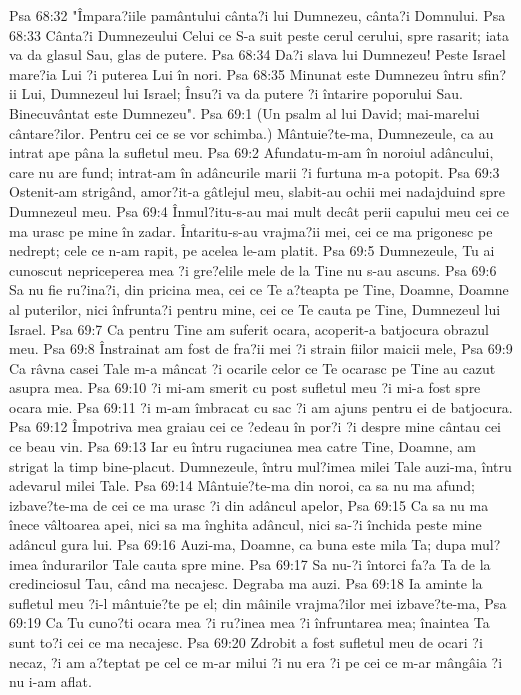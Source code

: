 Psa 68:32  "Împara?iile pamântului cânta?i lui Dumnezeu, cânta?i Domnului.
Psa 68:33  Cânta?i Dumnezeului Celui ce S-a suit peste cerul cerului, spre rasarit; iata va da glasul Sau, glas de putere.
Psa 68:34  Da?i slava lui Dumnezeu! Peste Israel mare?ia Lui ?i puterea Lui în nori.
Psa 68:35  Minunat este Dumnezeu întru sfin?ii Lui, Dumnezeul lui Israel; Însu?i va da putere ?i întarire poporului Sau. Binecuvântat este Dumnezeu".
Psa 69:1  (Un psalm al lui David; mai-marelui cântare?ilor. Pentru cei ce se vor schimba.) Mântuie?te-ma, Dumnezeule, ca au intrat ape pâna la sufletul meu.
Psa 69:2  Afundatu-m-am în noroiul adâncului, care nu are fund; intrat-am în adâncurile marii ?i furtuna m-a potopit.
Psa 69:3  Ostenit-am strigând, amor?it-a gâtlejul meu, slabit-au ochii mei nadajduind spre Dumnezeul meu.
Psa 69:4  Înmul?itu-s-au mai mult decât perii capului meu cei ce ma urasc pe mine în zadar. Întaritu-s-au vrajma?ii mei, cei ce ma prigonesc pe nedrept; cele ce n-am rapit, pe acelea le-am platit.
Psa 69:5  Dumnezeule, Tu ai cunoscut nepriceperea mea ?i gre?elile mele de la Tine nu s-au ascuns.
Psa 69:6  Sa nu fie ru?ina?i, din pricina mea, cei ce Te a?teapta pe Tine, Doamne, Doamne al puterilor, nici înfrunta?i pentru mine, cei ce Te cauta pe Tine, Dumnezeul lui Israel.
Psa 69:7  Ca pentru Tine am suferit ocara, acoperit-a batjocura obrazul meu.
Psa 69:8  Înstrainat am fost de fra?ii mei ?i strain fiilor maicii mele,
Psa 69:9  Ca râvna casei Tale m-a mâncat ?i ocarile celor ce Te ocarasc pe Tine au cazut asupra mea.
Psa 69:10  ?i mi-am smerit cu post sufletul meu ?i mi-a fost spre ocara mie.
Psa 69:11  ?i m-am îmbracat cu sac ?i am ajuns pentru ei de batjocura.
Psa 69:12  Împotriva mea graiau cei ce ?edeau în por?i ?i despre mine cântau cei ce beau vin.
Psa 69:13  Iar eu întru rugaciunea mea catre Tine, Doamne, am strigat la timp bine-placut. Dumnezeule, întru mul?imea milei Tale auzi-ma, întru adevarul milei Tale.
Psa 69:14  Mântuie?te-ma din noroi, ca sa nu ma afund; izbave?te-ma de cei ce ma urasc ?i din adâncul apelor,
Psa 69:15  Ca sa nu ma înece vâltoarea apei, nici sa ma înghita adâncul, nici sa-?i închida peste mine adâncul gura lui.
Psa 69:16  Auzi-ma, Doamne, ca buna este mila Ta; dupa mul?imea îndurarilor Tale cauta spre mine.
Psa 69:17  Sa nu-?i întorci fa?a Ta de la credinciosul Tau, când ma necajesc. Degraba ma auzi.
Psa 69:18  Ia aminte la sufletul meu ?i-l mântuie?te pe el; din mâinile vrajma?ilor mei izbave?te-ma,
Psa 69:19  Ca Tu cuno?ti ocara mea ?i ru?inea mea ?i înfruntarea mea; înaintea Ta sunt to?i cei ce ma necajesc.
Psa 69:20  Zdrobit a fost sufletul meu de ocari ?i necaz, ?i am a?teptat pe cel ce m-ar milui ?i nu era ?i pe cei ce m-ar mângâia ?i nu i-am aflat.
